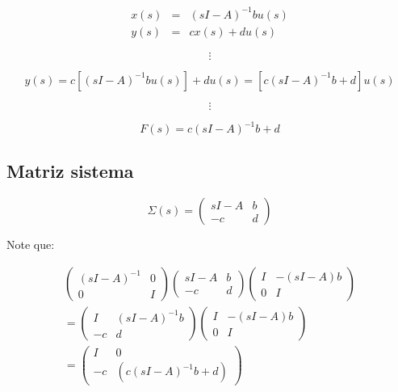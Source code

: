 \begin{eqnarray}
x(s) & = & (s I - A)^{-1} b u(s) \nonumber \\
y(s) & = & c x(s) + d u(s) \nonumber
\end{eqnarray}

\begin{equation}
\vdots \nonumber
\end{equation}

\begin{equation}
y(s) = c[(s I - A)^{-1} b u(s)] + d u(s) = [c(s I - A)^{-1} b + d] u(s) \nonumber
\end{equation}

\begin{equation}
\vdots \nonumber
\end{equation}

\begin{equation}
F(s) = c(s I - A)^{-1} b + d
\end{equation}

\subsection{Matriz sistema}

\begin{equation}
\Sigma(s) =
\begin{pmatrix}
sI - A & b \\
-c & d
\end{pmatrix}
\end{equation}

Note que:

\begin{multline}
\begin{pmatrix}
(sI - A)^{-1} & 0 \\
0 & I
\end{pmatrix}
\begin{pmatrix}
sI - A & b \\
-c & d
\end{pmatrix}
\begin{pmatrix}
I & -(sI - A)b \\
0 & I
\end{pmatrix}
\\
=
\begin{pmatrix}
I & (sI - A)^{-1} b \\
-c & d
\end{pmatrix}
\begin{pmatrix}
I & -(sI - A)b \\
0 & I
\end{pmatrix}
\\
=
\begin{pmatrix}
I & 0 \\
-c & (c(sI - A)^{-1} b + d)
\end{pmatrix}
\nonumber
\end{multline}

